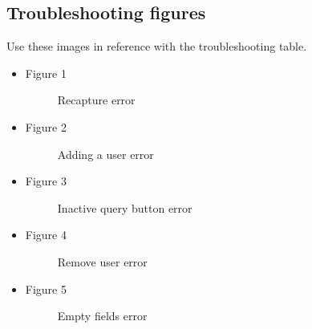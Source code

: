 \documentclass[14pt, a4paper]{article}
\begin{document}
\subsection{Troubleshooting figures}
Use these images in reference with the troubleshooting table.

\begin{itemize}
	\item Figure 1
	\begin{figure}[H]
        \centerline{}
		\caption{Recapture error}
      \end{figure}
	\item Figure 2
	\begin{figure}[H]
        \centerline{}
		\caption{Adding a user error}
      \end{figure}
	
	\item Figure 3
	\begin{figure}[H]
        \centerline{}
		\caption{Inactive query button error}
      \end{figure}
      \item Figure 4
	\begin{figure}[H]
        \centerline{}
		\caption{Remove user error}
      \end{figure}
	
	\item Figure 5
	\begin{figure}[H]
        \centerline{}
		\caption{Empty fields error}
      \end{figure}
\end{itemize}
\end{document}
